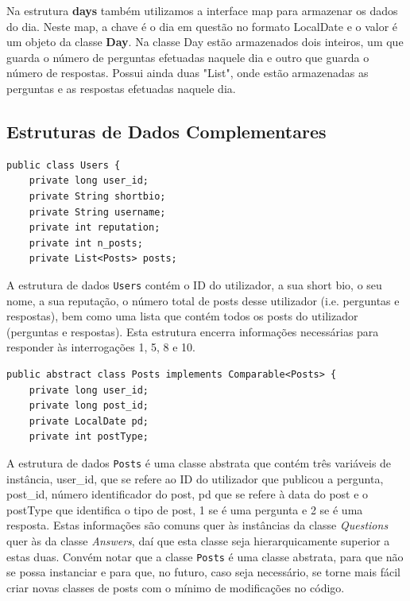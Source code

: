 \documentclass[a4paper]{article}
\begin{document}
Na estrutura \textbf{days} também utilizamos a interface map para armazenar
os dados do dia. Neste map, a chave é o dia em questão no formato LocalDate
e o valor é um objeto da classe \textbf{Day}. Na classe Day estão armazenados
dois inteiros, um que guarda o número de perguntas efetuadas naquele
dia e outro que guarda o número de respostas. Possui ainda duas "List", onde estão
armazenadas as perguntas e as respostas efetuadas naquele dia.


\subsection{Estruturas de Dados Complementares}
\label{sec:dados_complementares}

\begin{verbatim}
public class Users {
    private long user_id;
    private String shortbio;
    private String username;
    private int reputation;
    private int n_posts;
    private List<Posts> posts;
\end{verbatim}

A estrutura de dados \texttt{Users} contém o ID do utilizador, a sua short bio, o seu nome,
a sua reputação, o número total de posts desse utilizador (i.e. perguntas e respostas),
bem como uma lista que contém todos os posts do utilizador (perguntas e respostas).
Esta estrutura encerra informações necessárias para responder às interrogações 1,
5, 8 e 10.

\begin{verbatim}
public abstract class Posts implements Comparable<Posts> {
    private long user_id;
    private long post_id;
    private LocalDate pd;
    private int postType;
\end{verbatim}

A estrutura de dados \texttt{Posts} é uma classe abstrata que contém três variáveis
de instância, user\_id, que se refere ao ID do utilizador que publicou a pergunta,
post\_id, número identificador do post, pd que se refere à data do post e o
postType que identifica o tipo de post, 1 se é uma pergunta e 2 se é uma resposta.
Estas informações são comuns quer às instâncias da classe
\textit{Questions} quer às da classe \textit{Answers}, daí que esta classe seja
hierarquicamente superior a estas duas. Convém notar que a classe \texttt{Posts} é uma
classe abstrata, para que não se possa instanciar e para que, no futuro,
caso seja necessário, se torne mais fácil criar novas classes de posts com o
mínimo de modificações no código.
\end{document}
